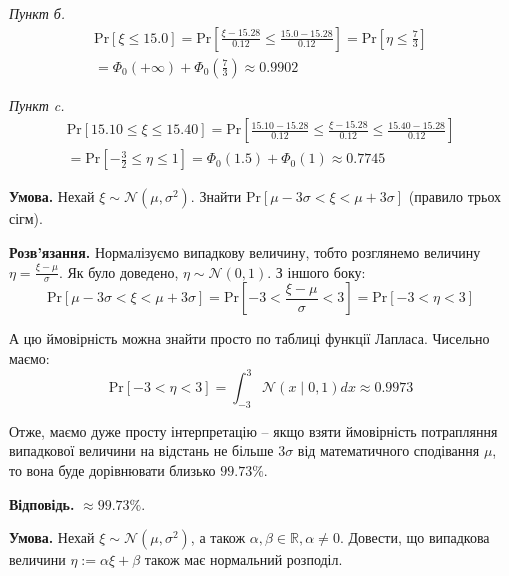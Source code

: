 \documentclass[oneside,solution]{karazin-prob-theory-assign}
\begin{document}
\textit{Пункт б.} 
\begin{gather}
    \text{Pr}[\xi \leq 15.0] = \text{Pr}\left[\frac{\xi-15.28}{0.12} \leq \frac{15.0-15.28}{0.12}\right] = \text{Pr}\left[\eta \leq \frac{7}{3}\right] \nonumber \\
    = \Phi_0(+\infty) + \Phi_0\left(\frac{7}{3}\right) \approx 0.9902
\end{gather}

\textit{Пункт c.} 
\begin{gather}
    \text{Pr}[15.10 \leq \xi \leq 15.40] = \text{Pr}\left[\frac{15.10-15.28}{0.12}\leq \frac{\xi-15.28}{0.12} \leq \frac{15.40-15.28}{0.12}\right] \nonumber \\ = \text{Pr}\left[-\frac{3}{2}\leq \eta \leq 1\right]
    = \Phi_0(1.5)+\Phi_0(1) \approx 0.7745
\end{gather}


\hspace{20px}\textbf{Умова.} Нехай $\xi \sim \mathcal{N}(\mu,\sigma^2)$. Знайти $\text{Pr}[\mu-3\sigma < \xi < \mu + 3\sigma]$ (правило трьох сігм).

\textbf{Розв'язання.} Нормалізуємо випадкову величину, тобто розглянемо величину $\eta = \frac{\xi-\mu}{\sigma}$. Як було доведено, $\eta \sim \mathcal{N}(0,1)$. З іншого боку:
\begin{equation}
    \text{Pr}[\mu-3\sigma < \xi < \mu + 3\sigma] = \text{Pr}\left[-3 < \frac{\xi-\mu}{\sigma} < 3\right] = \text{Pr}[-3 < \eta < 3]
\end{equation}

А цю ймовірність можна знайти просто по таблиці функції Лапласа. Чисельно маємо:
\begin{equation}
    \text{Pr}[-3<\eta<3] = \int_{-3}^3 \mathcal{N}(x \mid 0,1)dx \approx 0.9973
\end{equation}

Отже, маємо дуже просту інтерпретацію -- якщо взяти ймовірність потрапляння випадкової величини на відстань не більше $3\sigma$ від математичного сподівання $\mu$, то вона буде дорівнювати близько $99.73\%$. 

\textbf{Відповідь.} $\approx 99.73\%$.


\hspace{20px}\textbf{Умова.} Нехай $\xi \sim \mathcal{N}(\mu,\sigma^2)$, а також $\alpha,\beta \in \mathbb{R}, \alpha \neq 0$. Довести, що випадкова величини $\eta := \alpha \xi + \beta$ також має нормальний розподіл.
\end{document}
